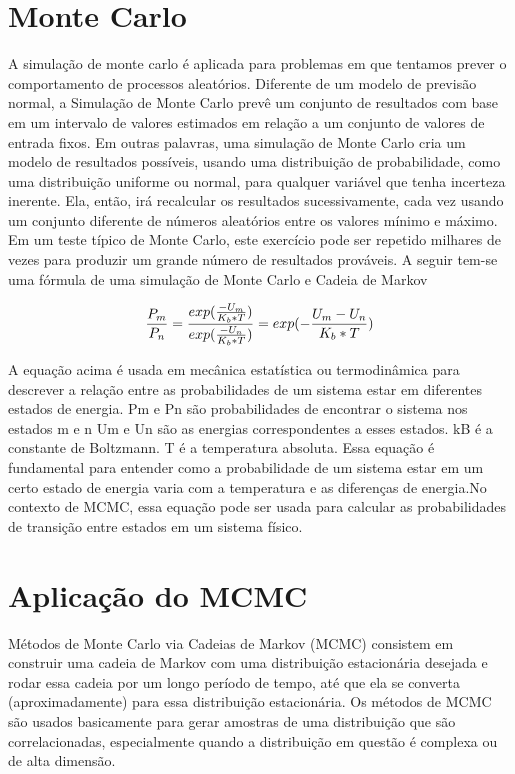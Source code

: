 \section{Monte Carlo}

    A simulação de monte carlo é aplicada para problemas em que tentamos prever o comportamento de processos aleatórios. Diferente de um modelo de previsão normal, a Simulação de Monte Carlo prevê um conjunto de resultados com base em um intervalo de valores estimados em relação a um conjunto de valores de entrada fixos. Em outras palavras, uma simulação de Monte Carlo cria um modelo de resultados possíveis, usando uma distribuição de probabilidade, como uma distribuição uniforme ou normal, para qualquer variável que tenha incerteza inerente. Ela, então, irá recalcular os resultados sucessivamente, cada vez usando um conjunto diferente de números aleatórios entre os valores mínimo e máximo. Em um teste típico de Monte Carlo, este exercício pode ser repetido milhares de vezes para produzir um grande número de resultados prováveis. A seguir tem-se uma fórmula de uma simulação de Monte Carlo e Cadeia de Markov


\begin{equation}
\label{eq:Fórmula de uma simulação de Monte Carlo e Cadeia de Markov}
    \frac{P_{m}}{P_{n}} = \frac{exp(\frac{-U_{m}}{K_{b}*T})}{exp(\frac{-U_{n}}{K_{b}*T})} = exp(-\frac{U_{m}-U_{n}}{K_{b}*T}) \\
\end{equation}


A equação acima é usada em mecânica estatística ou termodinâmica para descrever a relação entre as probabilidades de um sistema estar em diferentes estados de energia.
 Pm  e  Pn são probabilidades de encontrar o sistema nos estados m e n
Um e Un  são as energias correspondentes a esses estados.
kB é a constante de Boltzmann. T é a temperatura absoluta.
Essa equação é fundamental para entender como a probabilidade de um sistema estar em um certo estado de energia varia com a temperatura e as diferenças de energia.No contexto de MCMC, essa equação pode ser usada para calcular as probabilidades de transição entre estados em um sistema físico.

\section{Aplicação do MCMC}

Métodos de Monte Carlo via Cadeias de Markov (MCMC) consistem em construir uma cadeia de Markov com uma distribuição estacionária desejada e rodar essa cadeia por um longo período de tempo, até que ela se converta (aproximadamente) para essa distribuição estacionária. Os métodos de MCMC são usados basicamente para gerar amostras de uma distribuição que são correlacionadas, especialmente quando a distribuição em questão é complexa ou de alta dimensão.

